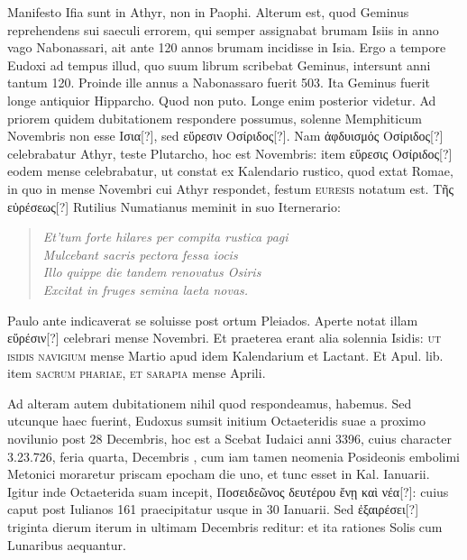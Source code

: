 Manifesto Ifia sunt in Athyr, non in Paophi.
Alterum est, quod
Geminus reprehendens sui saeculi errorem, qui semper assignabat brumam
Isiis in anno vago Nabonassari, ait ante 120 annos brumam incidisse
in Isia.
Ergo a tempore Eudoxi ad tempus illud, quo  suum librum
scribebat Geminus, intersunt anni tantum 120.
Proinde ille
annus a Nabonassaro fuerit 503.
Ita Geminus fuerit longe antiquior
Hipparcho.
Quod non puto.
Longe enim posterior videtur.
Ad priorem
quidem dubitationem respondere possumus, solenne Memphiticum
Novembris non esse \textgreek{Ισια[?]}, sed \textgreek{εὕρεσιν Οσίριδος[?]}.
Nam \textgreek{ἀφδυισμός Οσίριδος[?]}
celebrabatur  Athyr, teste Plutarcho, hoc est
 Novembris: item \textgreek{εὕρεσις Οσίριδος[?]}
 eodem mense celebrabatur,
ut constat ex Kalendario rustico, quod extat Romae, in quo
in mense Novembri cui Athyr respondet, festum \textsc{euresis} notatum
est.
\textgreek{Τῆς εὑρέσεως[?]} Rutilius Numatianus
 meminit in suo Iternerario:
\begin{quote}
\emph{Et'tum forte hilares per compita rustica pagi}\\
\emph{\hspace*{1em}Mulcebant sacris pectora fessa iocis}\\
\emph{Illo quippe die tandem renovatus Osiris}\\
\emph{\hspace*{1em}Excitat in fruges semina laeta novas.}
\end{quote}
Paulo ante indicaverat se soluisse post ortum Pleiados.
Aperte notat
illam \textgreek{εὕρέσιν[?]} celebrari mense Novembri.
Et praeterea erant alia
solennia Isidis: \textsc{ut isidis navigium} mense Martio apud idem Kalendarium
et Lactant.
Et Apul. lib.  item \textsc{sacrum phariae,
et sarapia} mense Aprili.

Ad alteram autem dubitationem nihil
quod respondeamus, habemus.
Sed utcunque haec fuerint, Eudoxus
sumsit initium Octaeteridis suae a proximo novilunio post 28 Decembris,
hoc est a Scebat Iudaici anni 3396, cuius character 3.23.726, feria
quarta, Decembris , cum iam tamen neomenia Posideonis embolimi
Metonici moraretur priscam epocham die uno, et tunc esset in
Kal. Ianuarii.
Igitur inde Octaeterida suam incepit,
 \textgreek{Ποσειδεῶνος δευτέρου ἔνῃ καὶ νέα[?]}:
cuius caput post Iulianos 161 praecipitatur usque in
30 Ianuarii.
Sed \textgreek{ἐξαιρέσει[?]} triginta dierum iterum in ultimam Decembris
reditur: et ita rationes Solis cum Lunaribus aequantur.

